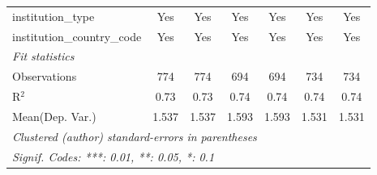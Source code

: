 \begin{tabular}{lcccccc}
   institution\_type                  & Yes     & Yes          & Yes     & Yes     & Yes         & Yes\\  
   institution\_country\_code         & Yes     & Yes          & Yes     & Yes     & Yes         & Yes\\  
   \midrule
   \emph{Fit statistics}\\
   Observations                       & 774     & 774          & 694     & 694     & 734         & 734\\  
   R$^2$                              & 0.73    & 0.73         & 0.74    & 0.74    & 0.74        & 0.74\\  
Mean(Dep. Var.) & 1.537 & 1.537 & 1.593 & 1.593 & 1.531 & 1.531 \\
   \midrule \midrule
   \multicolumn{7}{l}{\emph{Clustered (author) standard-errors in parentheses}}\\
   \multicolumn{7}{l}{\emph{Signif. Codes: ***: 0.01, **: 0.05, *: 0.1}}\\
\end{tabular}
\par\endgroup

